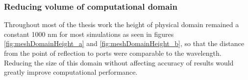 
\subsubsection*{Reducing volume of computational domain}

Throughout most of the thesis work the height of physical domain remained a constant 1000 nm for most simulations as seen in figures \ref{fig:meshDomainHeight_a} and \ref{fig:meshDomainHeight_b}, so that the distance from the point of reflection to ports were comparable to the wavelength. Reducing the size of this domain without affecting accuracy of results would greatly improve computational performance.


